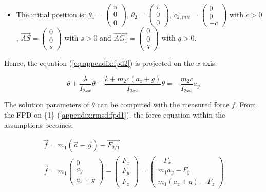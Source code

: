 \documentclass[\main/main.tex]{subfiles}
\begin{document}
\begin{itemize}
 \item The initial position is: $\theta_1 =
       \begin{pmatrix}
        \pi \\
        0 \\
        0
       \end{pmatrix}$, $\theta_2 =
       \begin{pmatrix}
        \pi \\
        0 \\
        0
       \end{pmatrix}$, $c_{2, init} =
       \begin{pmatrix}
        0 \\
        0 \\
        -c
       \end{pmatrix}$ with $c > 0$, $\overrightarrow{AS} =
       \begin{pmatrix}
        0  \\
        0  \\
        s
       \end{pmatrix}$ with $s > 0$ and $\overrightarrow{AG_1} =
       \begin{pmatrix}
        0  \\
        0  \\
        q
       \end{pmatrix}$ with $q > 0$.

\end{itemize}

Hence, the equation (\ref{eq:appendix:fpd2}) is projected on the $x$-axis:

\begin{equation*}
 \ddot{\theta} + \frac{\lambda}{I_{2xx}} \dot{\theta} + \frac{k + m_2 c (a_z + g)}{I_{2xx}} \theta = - \frac{m_2 c}{I_{2xx}} a_y
\end{equation*}

The solution parameters of $\theta$ can be computed with the measured force $f$. From the \ac{FPD} on \{1\} (\ref{appendix:rmsd:fpd1}), the force equation within the assumptions becomes:

\begin{gather}
  \label{appendix:rmsd:eq:fpd1}
 \overrightarrow{f} = m_1 (\overrightarrow{a} - \overrightarrow{g}) - \overrightarrow{F_{2/1}} \\
 \overrightarrow{f} = m_1
 \begin{pmatrix}
  0  \\
  a_y  \\
  a_z + g
 \end{pmatrix}
 - \begin{pmatrix}
 F_x \\
 F_y \\
 F_z
 \end{pmatrix}
 = \begin{pmatrix}
 - F_x \\
 m_1 a_y - F_y \\
 m_1 (a_z + g) - F_z
 \end{pmatrix}
\end{gather}
\end{document}
